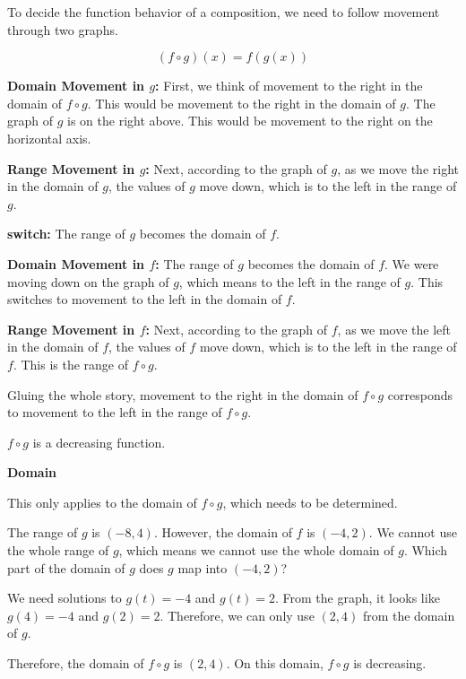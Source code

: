 \documentclass{ximera}
\begin{document}
To decide the function behavior of a composition, we need to follow movement through two graphs. 



\[
(f \circ g)(x) = f(g(x))
\]



\textbf{\textcolor{blue!55!black}{Domain Movement in $g$:}}  First, we think of movement to the right in the domain of $f \circ g$.  This would be movement to the right in the domain of $g$.  The graph of $g$ is on the right above.  This would be movement to the right on the horizontal axis.



\textbf{\textcolor{blue!55!black}{Range Movement in $g$:}}  Next, according to the graph of $g$, as we move the right in the domain of $g$, the values of $g$ move down, which is to the left in the range of $g$.




\textbf{\textcolor{blue!55!black}{switch:}}   The range of $g$ becomes the domain of $f$.  


\textbf{\textcolor{blue!55!black}{Domain Movement in $f$:}}   The range of $g$ becomes the domain of $f$.  We were moving down on the graph of $g$, which means to the left in the range of $g$.  This switches to movement to the left in the domain of $f$.


\textbf{\textcolor{blue!55!black}{Range Movement in $f$:}}  Next, according to the graph of $f$, as we move the left in the domain of $f$, the values of $f$ move down, which is to the left in the range of $f$.  This is the range of $f \circ g$.




Gluing the whole story, movement to the right in the domain of $f \circ g$ corresponds to movement to the left in the range of $f \circ g$.

$f \circ g$ is a decreasing function.



\begin{observation} \textbf{\textcolor{-red!75}{Domain}}


This only applies to the domain of $f \circ g$, which needs to be determined. 



The range of $g$ is $(-8, 4)$.  However, the domain of $f$ is $(-4, 2)$.   We cannot use the whole range of $g$, which means we cannot use the whole domain of $g$.  Which part of the domain of $g$ does $g$ map into $(-4, 2)$? 


We need solutions to $g(t) = -4$ and $g(t) = 2$.  From the graph, it looks like $g(4) = -4$  and $g(2) = 2$. Therefore, we can only use $(2, 4)$ from the domain of $g$.


Therefore, the domain of $f \circ g$ is $(2, 4)$.  On this domain, $f \circ g$ is decreasing.



\end{observation}
\end{document}
